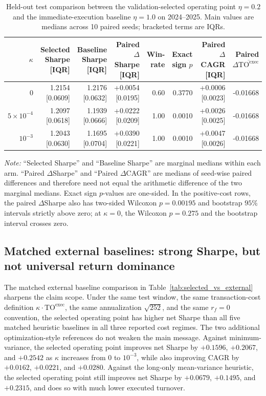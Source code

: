 \documentclass[10pt,twocolumn]{article}
\newcommand{\TOexec}{\mathrm{TO}^{\mathrm{exec}}}
\newcommand{\kappaTC}{\kappa}
\begin{document}
\begin{table}[t]
\centering
\scriptsize
\caption{Held-out test comparison between the validation-selected operating point $\eta=0.2$ and the immediate-execution baseline $\eta=1.0$ on 2024--2025. Main values are medians across 10 paired seeds; bracketed terms are IQRs.}
\label{tab:selected_vs_eta1}
\begin{tabular}{@{}rrrrrrrr@{}}
\toprule
$\kappaTC$ & Selected Sharpe [IQR] & Baseline Sharpe [IQR] & Paired $\Delta$Sharpe [IQR] & Win-rate & Exact sign $p$ & Paired $\Delta$CAGR [IQR] & Paired $\Delta\overline{\TOexec}$ \\
\midrule
$0$ & 1.2154 [0.0609] & 1.2176 [0.0632] & +0.0054 [0.0195] & 0.60 & 0.3770 & +0.0006 [0.0023] & -0.01668 \\
$5\times10^{-4}$ & 1.2097 [0.0618] & 1.1939 [0.0666] & +0.0222 [0.0209] & 1.00 & 0.0010 & +0.0026 [0.0025] & -0.01668 \\
$10^{-3}$ & 1.2043 [0.0630] & 1.1695 [0.0704] & +0.0390 [0.0221] & 1.00 & 0.0010 & +0.0047 [0.0026] & -0.01668 \\
\bottomrule
\end{tabular}
\par\vspace{2pt}\raggedright\footnotesize{\textit{Note:} ``Selected Sharpe'' and ``Baseline Sharpe'' are marginal medians within each arm. ``Paired $\Delta$Sharpe'' and ``Paired $\Delta$CAGR'' are medians of seed-wise paired differences and therefore need not equal the arithmetic difference of the two marginal medians. Exact sign $p$-values are one-sided. In the positive-cost rows, the paired $\Delta$Sharpe also has two-sided Wilcoxon $p=0.00195$ and bootstrap $95\%$ intervals strictly above zero; at $\kappaTC=0$, the Wilcoxon $p=0.275$ and the bootstrap interval crosses zero.}
\end{table}

\subsection{Matched external baselines: strong Sharpe, but not universal return dominance}
The matched external baseline comparison in Table~\ref{tab:selected_vs_external} sharpens the claim scope. Under the same test window, the same transaction-cost definition $\kappaTC\cdot\TOexec$, the same annualization $\sqrt{252}$, and the same $r_f=0$ convention, the selected operating point has higher net Sharpe than all five matched heuristic baselines in all three reported cost regimes. The two additional optimization-style references do not weaken the main message. Against minimum-variance, the selected operating point improves net Sharpe by $+0.1596$, $+0.2067$, and $+0.2542$ as $\kappaTC$ increases from $0$ to $10^{-3}$, while also improving CAGR by $+0.0162$, $+0.0221$, and $+0.0280$. Against the long-only mean-variance heuristic, the selected operating point still improves net Sharpe by $+0.0679$, $+0.1495$, and $+0.2315$, and does so with much lower executed turnover.
\end{document}
